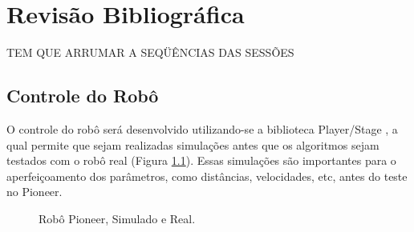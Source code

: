 % 
% 

\chapter{Revisão Bibliográfica}
\label{revisao_bibliografica}
TEM QUE ARRUMAR A SEQÜÊNCIAS DAS SESSÕES

\section{Controle do Robô}
\label{controle_do_robo}
O controle do robô será desenvolvido utilizando-se a biblioteca Player/Stage \cite{Gerkey2003}, a qual permite que sejam realizadas simulações antes que os algoritmos sejam testados com o robô real (Figura \ref{fig:gazebo_pioneer}). Essas simulações são importantes para o aperfeiçoamento dos parâmetros, como distâncias, velocidades, etc, antes do teste no Pioneer.

\begin{figure}[ht]
	\centering
	\caption{Robô Pioneer, Simulado e Real.}
	\label{fig:gazebo_pioneer}
\end{figure}

